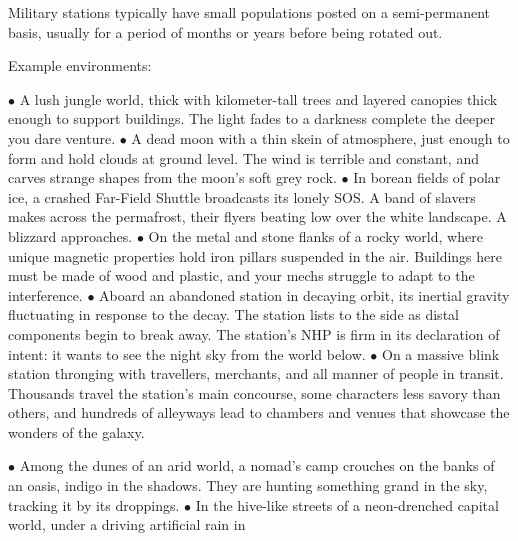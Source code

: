 Military stations typically have small populations posted on a semi-permanent basis, usually for a  
period of months or years before being rotated out.   
 

Example environments:  
 

    $\bullet$    A lush jungle world, thick with kilometer-tall trees and layered canopies thick enough to  
        support buildings. The light fades to a darkness complete the deeper you dare venture.  
    $\bullet$    A dead moon with a thin skein of atmosphere, just enough to form and hold clouds at  
        ground level. The wind is terrible and constant, and carves strange shapes from the  
        moon’s soft grey rock.    
    $\bullet$    In borean fields of polar ice, a crashed Far-Field Shuttle broadcasts its lonely SOS. A band  
        of slavers makes across the permafrost, their flyers beating low over the white landscape.  
        A blizzard approaches.        
    $\bullet$    On the metal and stone flanks of a rocky world, where unique magnetic properties hold  
        iron pillars suspended in the air. Buildings here must be made of wood and plastic, and  
        your mechs struggle to adapt to the interference.    
    $\bullet$    Aboard an abandoned station in decaying orbit, its inertial gravity fluctuating in response  
        to the decay. The station lists to the side as distal components begin to break away. The  
        station’s NHP is firm in its declaration of intent: it wants to see the night sky from the  
        world below.     
    $\bullet$    On a massive blink station thronging with travellers, merchants, and all manner of people  
        in transit. Thousands travel the station’s main concourse, some characters less savory  
        than others, and hundreds of alleyways lead to chambers and venues that showcase the  
        wonders of the galaxy.   

                                                                                                         


$\bullet$    Among the dunes of an arid world, a nomad’s camp crouches on the banks of an oasis,  
    indigo in the shadows. They are hunting something grand in the sky, tracking it by its  
    droppings.   
$\bullet$    In the hive-like streets of a neon-drenched capital world, under a driving artificial rain in  

